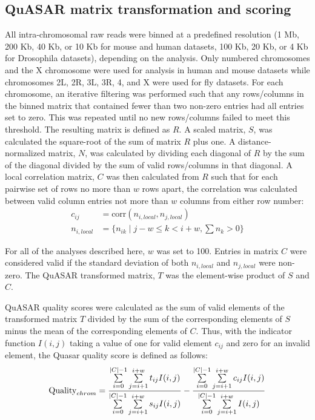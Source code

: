 \subsection{QuASAR matrix transformation and scoring}

All intra-chromosomal raw reads were binned at a predefined resolution (1 Mb, 200 Kb, 40 Kb, or 10 Kb for mouse and human datasets, 100 Kb, 20 Kb, or 4 Kb for Drosophila datasets), depending on the analysis. Only numbered chromosomes and the X chromosome were used for analysis in human and mouse datasets while chromosomes 2L, 2R, 3L, 3R, 4, and X were used for fly datasets. For each chromosome, an iterative filtering was performed such that any rows/columns in the binned matrix that contained fewer than two non-zero entries had all entries set to zero. This was repeated until no new rows/columns failed to meet this threshold. The resulting matrix is defined as $R$. A scaled matrix, $S$, was calculated the square-root of the sum of matrix $R$ plus one. A distance-normalized matrix, $N$, was calculated by dividing each diagonal of $R$ by the sum of the diagonal divided by the sum of valid rows/columns in that diagonal. A local correlation matrix, $C$ was then calculated from $R$ such that for each pairwise set of rows no more than $w$ rows apart, the correlation was calculated between valid column entries not more than $w$ columns from either row number:
\begin{align*}
  c_{ij} &= \text{corr}(n_{i,local},n_{j,local}) \\
  n_{i,local} &= \{ n_{ik} \mid j-w \leq k < i+w, \sum n_k > 0 \}
\end{align*}
  
For all of the analyses described here, $w$ was set to 100. Entries in matrix $C$ were considered valid if the standard deviation of both $n_{i,local}$ and $n_{j,local}$ were non-zero. The QuASAR transformed matrix, $T$ was the element-wise product of $S$ and $C$.

QuASAR quality scores were calculated as the sum of valid elements of the transformed matrix $T$ divided by the sum of the corresponding elements of $S$ minus the mean of the corresponding elements of $C$. Thus, with the indicator function $I(i,j)$ taking a value of one for valid element $c_{ij}$ and zero for an invalid element, the Quasar quality score is defined as follows:
\[\textnormal{Quality}_{chrom}=\frac{\sum\limits_{i=0}^{|C|-1}\sum\limits_{j=i+1}^{i+w}t_{ij}I(i,j)}{\sum\limits_{i=0}^{|C|-1}\sum\limits_{j=i+1}^{i+w}s_{ij}I(i,j)}-\frac{\sum\limits_{i=0}^{|C|-1}\sum\limits_{j=i+1}^{i+w}c_{ij}I(i,j)}{\sum\limits_{i=0}^{|C|-1}\sum\limits_{j=i+1}^{i+w}I(i,j)}\]


